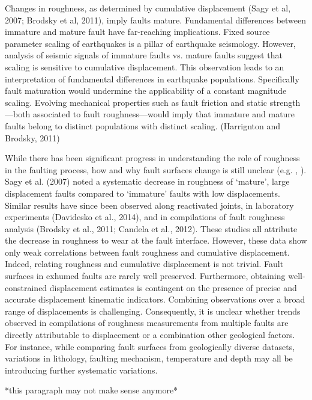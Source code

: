 \documentclass[12pt,a4paper]{article}
\begin{document}
Changes in roughness, as determined by cumulative displacement (Sagy et al, 2007; Brodsky et al, 2011), imply faults mature. Fundamental differences between immature and mature fault have far-reaching implications. Fixed source parameter scaling of earthquakes is a pillar of earthquake seismology. However, analysis of seismic signals of immature faults vs. mature faults suggest that scaling is sensitive to cumulative displacement. This observation leads to an interpretation of fundamental differences in earthquake populations. Specifically fault maturation would undermine the applicability of a constant magnitude scaling. Evolving mechanical properties such as fault friction and static strength—both associated to fault roughness—would imply that immature and mature faults belong to distinct populations with distinct scaling. (Harrignton and Brodsky, 2011)

While there has been significant progress in understanding the role of roughness in the faulting process, how and why fault surfaces change is still unclear (e.g. \cite{candela2010characterization}, \cite{brodsky2016constraints}). Sagy et al. (2007) noted a systematic decrease in roughness of ‘mature’, large displacement faults compared to ‘immature’ faults with low displacements. Similar results have since been observed along reactivated joints, in laboratory experiments (Davidesko et al., 2014), and in compilations of fault roughness analysis (Brodsky et al., 2011; Candela et al., 2012). These studies all attribute the decrease in roughness to wear at the fault interface. However, these data show only weak correlations between fault roughness and cumulative displacement. Indeed, relating roughness and cumulative displacement is not trivial. Fault surfaces in exhumed faults are rarely well preserved. Furthermore, obtaining well-constrained displacement estimates is contingent on the presence of precise and accurate displacement kinematic indicators. Combining observations over a broad range of displacements is challenging. Consequently, it is unclear whether trends observed in compilations of roughness measurements from multiple faults are directly attributable to displacement or a combination other geological factors. For instance, while comparing fault surfaces from geologically diverse datasets, variations in lithology, faulting mechanism, temperature and depth may all be introducing further systematic variations. 

*this paragraph may not make sense anymore*
\end{document}
